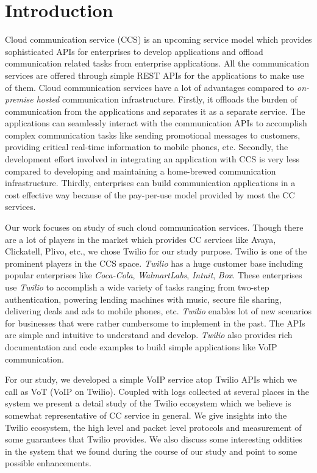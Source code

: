 \section{Introduction}
\label{sec-intro}
Cloud communication service (CCS) is an upcoming service model which provides sophisticated APIs for enterprises to develop applications and offload communication related tasks from enterprise applications. 
All the communication services are offered through simple REST APIs for the applications to make use of them. Cloud communication services have a lot of advantages compared to \textit{on-premise hosted} communication infrastructure. Firstly, it offloads the burden of communication from the applications and separates it as a separate service. The applications can seamlessly interact with the communication APIs to accomplish complex communication tasks like sending promotional messages to customers, providing critical real-time information to mobile phones, etc. Secondly, the development effort involved in integrating an application with CCS is very less compared to developing and maintaining a home-brewed communication infrastructure.
Thirdly, enterprises can build communication applications in a cost effective way because of the pay-per-use model provided by most the CC services. 


Our work focuses on study of such cloud communication services. Though there are a lot of players in the market which provides CC services like Avaya, Clickatell, Plivo, etc., we chose Twilio for our study purpose. {Twilio} is one of the prominent players in the CCS space. \textit{Twilio} has a huge customer base  including popular enterprises like \textit{Coca-Cola}, \textit{WalmartLabs}, \textit{Intuit}, \textit{Box}. These enterprises use \textit{Twilio} to accomplish a wide variety of tasks ranging from two-step authentication, powering lending machines with music, secure file sharing, delivering deals and ads to mobile phones, etc. \textit{Twilio} enables lot of new scenarios for businesses that were rather cumbersome to implement in the past. 
The APIs are simple and intuitive to understand and develop. \textit{Twilio} also provides rich documentation and code examples to build simple applications like VoIP communication.

 For our study, we developed a simple VoIP service atop Twilio APIs which we call as VoT (VoIP on Twilio). Coupled with logs collected at several places in the system we present a detail study of the Twilio ecosystem which we believe is somewhat representative of CC service in general. We give insights into the Twilio ecosystem, the high level and packet level protocols and measurement of some guarantees that Twilio provides.  We also discuss some interesting oddities in the system that we found during the course of our study and point to some possible enhancements. 